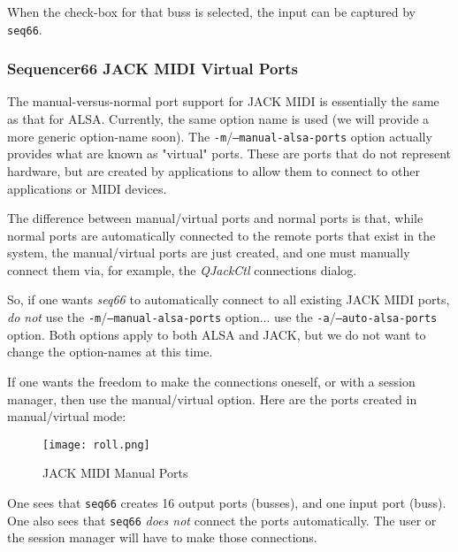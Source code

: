    When the check-box for that buss is selected, the input can be captured by
   \texttt{seq66}.

\subsubsection{Sequencer66 JACK MIDI Virtual Ports}
\label{subsubsec:seq66_jack_midi_virtual_ports}

   The manual-versus-normal port support for JACK MIDI is essentially the same
   as that for ALSA.  Currently, the same option name is used (we will provide
   a more generic option-name soon).
   The \texttt{-m}/\texttt{--manual-alsa-ports} option actually provides what
   are known as "virtual" ports.  These are ports that do not represent
   hardware, but are created by applications to allow them to connect to other
   applications or MIDI devices.

   The difference between manual/virtual ports and normal ports is that, while
   normal ports are automatically connected to the remote ports that exist in
   the system, the manual/virtual ports are just created, and one must
   manually connect them via, for example, the
   \textsl{QJackCtl} connections dialog.

   So, if one wants \textsl{seq66} to automatically connect to all existing
   JACK MIDI ports, \textsl{do not} use the
   \texttt{-m}/\texttt{--manual-alsa-ports} option... use the
   \texttt{-a}/\texttt{--auto-alsa-ports} option.  Both options apply to both
   ALSA and JACK, but we do not want to change the option-names at this time.

   If one wants the freedom to make the connections oneself, or with a session
   manager, then use the manual/virtual option.
   Here are the ports created in manual/virtual mode:

\begin{figure}[H]
   \centering 
   \texttt{[image: roll.png]}
   \caption{JACK MIDI Manual Ports}
   \label{fig:seq66_jack_nano_yosh_midi_manual}
\end{figure}

   One sees that \texttt{seq66} creates 16 output ports (busses), and one input
   port (buss).  One also sees that \texttt{seq66} \textsl{does not} connect
   the ports automatically.  The user or the session manager will have to make
   those connections.

